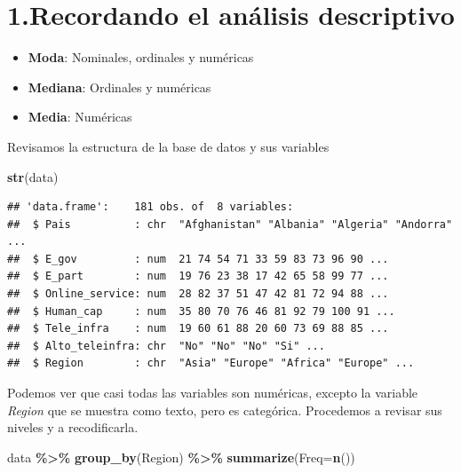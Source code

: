 \documentclass[
]{article}
\newenvironment{Shaded}{\begin{snugshade}}{\end{snugshade}}
\newcommand{\AttributeTok}[1]{\textcolor[rgb]{0.13,0.29,0.53}{#1}}
\newcommand{\FunctionTok}[1]{\textcolor[rgb]{0.13,0.29,0.53}{\textbf{#1}}}
\newcommand{\NormalTok}[1]{#1}
\newcommand{\SpecialCharTok}[1]{\textcolor[rgb]{0.81,0.36,0.00}{\textbf{#1}}}
\providecommand{\tightlist}{%
  \setlength{\itemsep}{0pt}\setlength{\parskip}{0pt}}
\begin{document}
\hypertarget{recordando-el-anuxe1lisis-descriptivo}{%
\section{\texorpdfstring{\textbf{1.Recordando el análisis
descriptivo}}{1.Recordando el análisis descriptivo}}\label{recordando-el-anuxe1lisis-descriptivo}}

\begin{itemize}
\tightlist
\item
  \textbf{Moda}: Nominales, ordinales y numéricas
\item
  \textbf{Mediana}: Ordinales y numéricas
\item
  \textbf{Media}: Numéricas
\end{itemize}

Revisamos la estructura de la base de datos y sus variables

\begin{Shaded}
\begin{Highlighting}[]
\FunctionTok{str}\NormalTok{(data)}
\end{Highlighting}
\end{Shaded}

\begin{verbatim}
## 'data.frame':    181 obs. of  8 variables:
##  $ Pais          : chr  "Afghanistan" "Albania" "Algeria" "Andorra" ...
##  $ E_gov         : num  21 74 54 71 33 59 83 73 96 90 ...
##  $ E_part        : num  19 76 23 38 17 42 65 58 99 77 ...
##  $ Online_service: num  28 82 37 51 47 42 81 72 94 88 ...
##  $ Human_cap     : num  35 80 70 76 46 81 92 79 100 91 ...
##  $ Tele_infra    : num  19 60 61 88 20 60 73 69 88 85 ...
##  $ Alto_teleinfra: chr  "No" "No" "No" "Si" ...
##  $ Region        : chr  "Asia" "Europe" "Africa" "Europe" ...
\end{verbatim}

Podemos ver que casi todas las variables son numéricas, excepto la
variable \emph{Region} que se muestra como texto, pero es categórica.
Procedemos a revisar sus niveles y a recodificarla.

\begin{Shaded}
\begin{Highlighting}[]
\NormalTok{data }\SpecialCharTok{\%\textgreater{}\%} 
 \FunctionTok{group\_by}\NormalTok{(Region) }\SpecialCharTok{\%\textgreater{}\%} 
  \FunctionTok{summarize}\NormalTok{(}\AttributeTok{Freq=}\FunctionTok{n}\NormalTok{())}
\end{Highlighting}
\end{Shaded}
\end{document}
